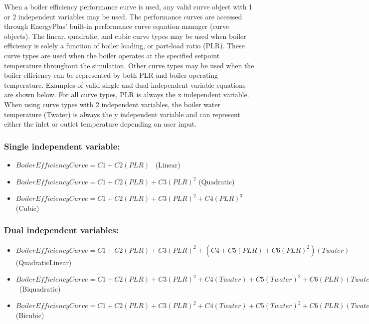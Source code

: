 When a boiler efficiency performance curve is used, any valid curve object with 1 or 2 independent variables may be used. The performance curves are accessed through EnergyPlus' built-in performance curve equation manager (curve objects). The linear, quadratic, and cubic curve types may be used when boiler efficiency is solely a function of boiler loading, or part-load ratio (PLR). These curve types are used when the boiler operates at the specified setpoint temperature throughout the simulation. Other curve types may be used when the boiler efficiency can be represented by both PLR and boiler operating temperature. Examples of valid single and dual independent variable equations are shown below. For all curve types, PLR is always the x independent variable. When using curve types with 2 independent variables, the boiler water temperature (Twater) is always the y independent variable and can represent either the inlet or outlet temperature depending on user input.

\subsubsection{Single independent variable:}\label{single-independent-variable}

\begin{itemize}
\item
  \(BoilerEfficiencyCurve = C1 + C2\left( {PLR} \right)\) ~(Linear)
\item
  \(BoilerEfficiencyCurve = C1 + C2\left( {PLR} \right) + C3{\left( {PLR} \right)^2}\) (Quadratic)
\item
  \(BoilerEfficiencyCurve = C1 + C2\left( {PLR} \right) + C3{\left( {PLR} \right)^2} + C4{(PLR)^3}\) (Cubic)
\end{itemize}

\subsubsection{Dual independent variables:}\label{dual-independent-variables}

\begin{itemize}
\item
  \(BoilerEfficiencyCurve = C1 + C2\left( {PLR} \right) + C3{\left( {PLR} \right)^2} + \left( {C4 + C5\left( {PLR} \right) + C6{{\left( {PLR} \right)}^2}} \right)\left( {Twater} \right)\) (QuadraticLinear)
\item
  \(BoilerEfficiencyCurve = C1 + C2\left( {PLR} \right) + C3{\left( {PLR} \right)^2} + C4\left( {Twater} \right) + C5{(Twater)^2} + C6(PLR)(Twater)\) ~(Biquadratic)
\item
  \(BoilerEfficiencyCurve = C1 + C2\left( {PLR} \right) + C3{\left( {PLR} \right)^2} + C4\left( {Twater} \right) + C5{(Twater)^2} + C6\left( {PLR} \right)\left( {Twater} \right) + C7{(PLR)^3} + C8{(Twater)^3} + C9{\left( {PLR} \right)^2}\left( {Twater} \right) + C10\left( {PLR} \right){(Twater)^2}\) (Bicubic)
\end{itemize}

